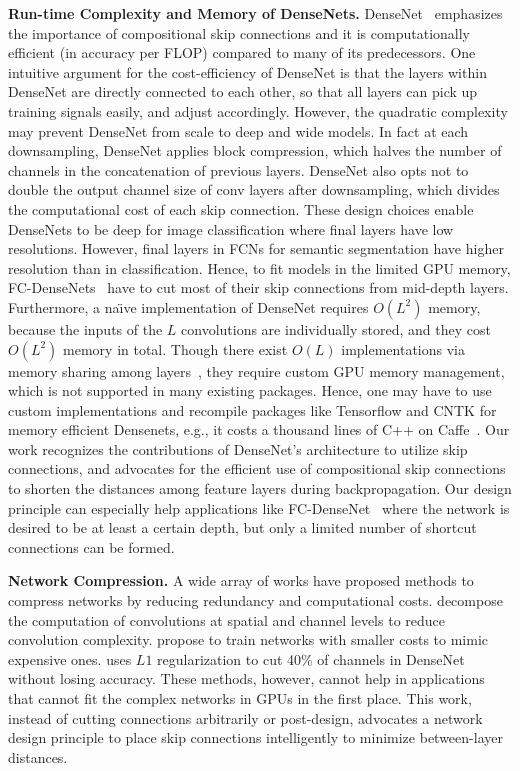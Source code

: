 \documentclass{article}
\newcommand{\naive}{na\"{\i}ve\xspace}
\begin{document}
\textbf{Run-time Complexity and Memory of DenseNets.}
DenseNet~\citep{densenet} emphasizes the importance of compositional skip connections and it is computationally efficient (in accuracy per FLOP) compared to many of its predecessors.  One intuitive argument for the cost-efficiency of DenseNet is that the layers within DenseNet are directly connected to each other, so that all layers can pick up training signals easily, and adjust accordingly.  However, the quadratic complexity may prevent DenseNet from scale to deep and wide models. In fact at each downsampling, DenseNet applies block compression, which halves the number of channels in the concatenation of previous layers. DenseNet also opts not to double the output channel size of conv layers after downsampling, which divides the computational cost of each skip connection. 
These design choices enable DenseNets to be deep for image classification where final layers have low resolutions. 
However, final layers in FCNs for semantic segmentation have higher resolution than in classification. Hence, to fit models in the limited GPU memory, FC-DenseNets~\citep{fcdense} have to cut most of their skip connections from mid-depth layers. 
Furthermore, a \naive implementation of DenseNet requires $O(L^2)$ memory, because the inputs of the $L$ convolutions are individually stored, and they cost $O(L^2)$ memory in total.   
Though there exist $O(L)$ implementations via memory sharing among layers~\citep{densenet_torch}, they require custom GPU memory management, which is not supported in many existing packages. Hence, one may have to use custom implementations and recompile packages like Tensorflow and CNTK for memory efficient Densenets, e.g., it costs a thousand lines of C++ on Caffe~\citep{densenet_caffe}. 
Our work recognizes the contributions of DenseNet's architecture to utilize skip connections, and advocates for the efficient use of compositional skip connections to shorten the distances among feature layers during backpropagation. Our design principle can especially help applications like FC-DenseNet~\citep{fcdense} where the network is desired to be at least a certain depth, but only a limited number of shortcut connections can be formed. 

\textbf{Network Compression.} 
A wide array of works have proposed methods to compress networks by reducing redundancy and computational costs. \citep{linear_structure_in_cnn, compress4mobile, deep_roots} decompose the computation of convolutions at spatial and channel levels to reduce convolution complexity. \citep{distillation, deepreally} propose to train networks with smaller costs to mimic expensive ones. \citep{slim_nn} uses $L1$ regularization to cut 40\% of channels in DenseNet without losing accuracy. These methods, however, cannot help in applications that cannot fit the complex networks in GPUs in the first place. This work, instead of cutting connections arbitrarily or post-design, advocates a network design principle to place skip connections intelligently to minimize between-layer distances.
\end{document}
